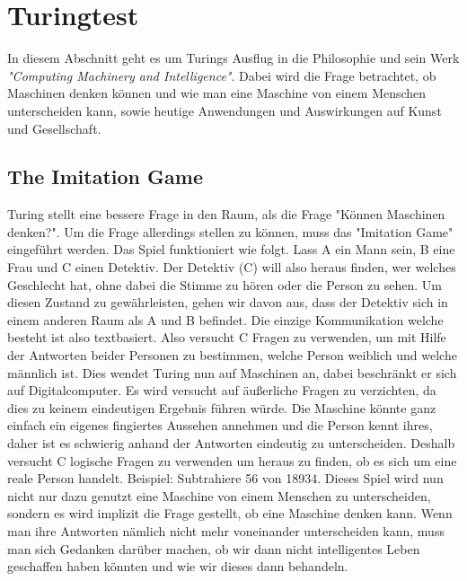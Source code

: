 \section{Turingtest}
\label{turingtest}
In diesem Abschnitt geht es um Turings Ausflug in die Philosophie und sein Werk \textit{"Computing Machinery and Intelligence"}. Dabei wird die Frage betrachtet, ob Maschinen denken können und wie man eine Maschine von einem Menschen unterscheiden kann, sowie heutige Anwendungen und Auswirkungen auf Kunst und Gesellschaft.
\subsection{The Imitation Game}
Turing stellt eine bessere Frage in den Raum, als die Frage "Können Maschinen denken?". Um die Frage allerdings stellen zu können, muss das "Imitation Game" eingeführt werden. Das Spiel funktioniert wie folgt. Lass A ein Mann sein, B eine Frau und C einen Detektiv. Der Detektiv (C) will also heraus finden, wer welches Geschlecht hat, ohne dabei die Stimme zu hören oder die Person zu sehen. Um diesen Zustand zu gewährleisten, gehen wir davon aus, dass der Detektiv sich in einem anderen Raum als A und B befindet. Die einzige Kommunikation welche besteht ist also textbasiert. Also versucht C Fragen zu verwenden, um mit Hilfe der Antworten beider Personen zu bestimmen, welche Person weiblich und welche männlich ist. Dies wendet Turing nun auf Maschinen an, dabei beschränkt er sich auf Digitalcomputer. Es wird versucht auf äußerliche Fragen zu verzichten, da dies zu keinem eindeutigen Ergebnis führen würde. Die Maschine könnte ganz einfach ein eigenes fingiertes Aussehen annehmen und die Person kennt ihres, daher ist es schwierig anhand der Antworten eindeutig zu unterscheiden. Deshalb versucht C logische Fragen zu verwenden um heraus zu finden, ob es sich um eine reale Person handelt. Beispiel: Subtrahiere 56 von 18934.\cite{computing} Dieses Spiel wird nun nicht nur dazu genutzt eine Maschine von einem Menschen zu unterscheiden, sondern es wird implizit die Frage gestellt, ob eine Maschine denken kann. Wenn man ihre Antworten nämlich nicht mehr voneinander unterscheiden kann, muss man sich Gedanken darüber machen, ob wir dann nicht intelligentes Leben geschaffen haben könnten und wie wir dieses dann behandeln.
